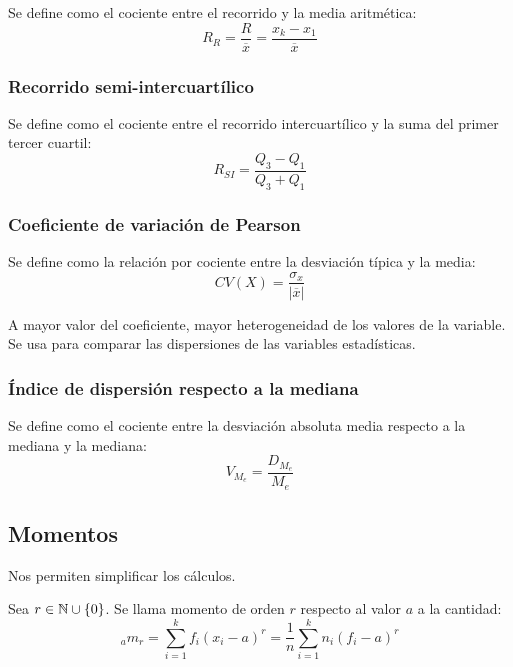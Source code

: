 Se define como el cociente entre el recorrido y la media aritmética:
$$R_R = \dfrac{R}{\overline{x}}= \dfrac{x_k - x_1}{\overline{x}}$$

\subsubsection{Recorrido semi-intercuartílico}

Se define como el cociente entre el recorrido intercuartílico y la suma del primer tercer cuartil:
$$R_{SI} = \dfrac{Q_3 - Q_1}{Q_3 + Q_1}$$

\subsubsection{Coeficiente de variación de Pearson}

Se define como la relación por cociente entre la desviación típica y la media:
$$CV(X)= \dfrac{\sigma_x}{|\overline{x}|}$$

A mayor valor del coeficiente, mayor heterogeneidad de los valores de la variable. Se usa para comparar las dispersiones de las variables estadísticas.

\subsubsection{Índice de dispersión respecto a la mediana}

Se define como el cociente entre la desviación absoluta media respecto a la mediana y la mediana:
$$V_{M_e} = \dfrac{D_{M_e}}{M_e}$$

\subsection{Momentos}

Nos permiten simplificar los cálculos.

 Sea $r \in \mathbb N \cup \{0\}$. Se llama momento de orden $r$ respecto al valor $a$ a la cantidad:
$$_am_r = \sum_{i=1}^k f_i (x_i - a)^r = \frac{1}{n} \sum_{i=1}^k n_i (f_i - a)^r$$

